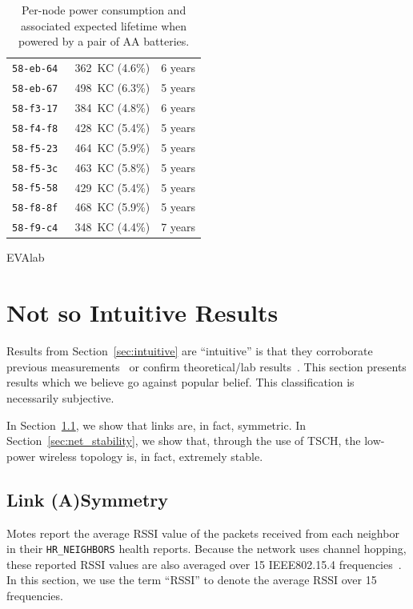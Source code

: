 \documentclass{elsarticle}
\newcommand{\HRNEIGHBORS}         {{\tt HR\_NEIGHBORS}\xspace}
\begin{document}
\begin{table}
\begin{subtable}{.45\textwidth}
\begin{tabular}{|c|c|c|}
        \tt{58-eb-64} &  362~KC (4.6\%)  &  6 years \\
        \tt{58-eb-67} &  498~KC (6.3\%)  &  5 years \\
        \tt{58-f3-17} &  384~KC (4.8\%)  &  6 years \\
        \tt{58-f4-f8} &  428~KC (5.4\%)  &  5 years \\
        \tt{58-f5-23} &  464~KC (5.9\%)  &  5 years \\
        \tt{58-f5-3c} &  463~KC (5.8\%)  &  5 years \\
        \tt{58-f5-58} &  429~KC (5.4\%)  &  5 years \\
        \tt{58-f8-8f} &  468~KC (5.9\%)  &  5 years \\
        \tt{58-f9-c4} &  348~KC (4.4\%)  &  7 years \\
        \bottomrule
    \end{tabular}
    \caption{EVAlab}
\end{subtable}\hfill
\caption{Per-node power consumption and associated expected lifetime when powered by a pair of AA batteries.}
\label{tab:stats_charge}
\end{table}
\section{Not so Intuitive Results}
\label{sec:notsointuitive}

Results from Section~\ref{sec:intuitive} are ``intuitive'' is that they corroborate previous measurements~\cite{watteyne16peach} or confirm theoretical/lab results~\cite{watteyne10mitigating,watteyne09reliability,watteyne15industrial}.
This section presents results which we believe go against popular belief.
This classification is necessarily subjective.

In Section~\ref{sec:symmetry}, we show that links are, in fact, symmetric.
In Section~\ref{sec:net_stability}, we show that, through the use of TSCH, the low-power wireless topology is, in fact, extremely stable.

\subsection{Link (A)Symmetry}
\label{sec:symmetry}


Motes report the average RSSI value of the packets received from each neighbor in their \HRNEIGHBORS health reports.
Because the network uses channel hopping, these reported RSSI values are also averaged over 15 IEEE802.15.4 frequencies~\cite{std_ieee802154_2011}.
In this section, we use the term ``RSSI'' to denote the average RSSI over 15 frequencies.
\end{document}
